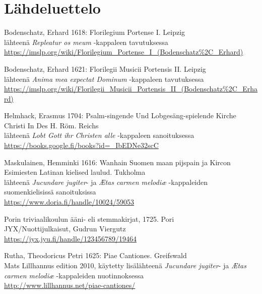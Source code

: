 \chapter*{Lähdeluettelo}

Bodenschatz, Erhard 1618: Florilegium Portense I. Leipzig \\
lähteenä \emph{Repleatur os meum} -kappaleen tavutuksessa \\
\url{https://imslp.org/wiki/Florilegium\_Portense\_I\_(Bodenschatz%2C\_Erhard)}

Bodenschatz, Erhard 1621: Florilegii Musicii Portensis II. Leipzig \\
lähteenä \emph{Anima mea expectat Dominum} -kappaleen tavutuksessa \\
\url{https://imslp.org/wiki/Florilegii\_Musicii\_Portensis\_II\_(Bodenschatz%2C\_Erhard)}

Helmhack, Erasmus 1704: Psalm-singende Und Lobgesäng-spielende Kirche Christi In Des H. Röm. Reichs \\
lähteenä \emph{Lobt Gott ihr Christen alle} -kappaleen sanoituksessa \\
\url{https://books.google.fi/books?id=\_IbEDNe32scC}

Maskulainen, Hemminki 1616: Wanhain Suomen maan pijspain ja Kircon Esimiesten Latinan kielised laulud. Tukholma \\
lähteenä \emph{Jucundare jugiter}- ja \emph{Ætas carmen melodiæ} -kappaleiden suomenkielisissä sanoituksissa \\
\url{https://www.doria.fi/handle/10024/59053}

Porin triviaalikoulun ääni- eli stemmakirjat, 1725. Pori \\
JYX/Nuottijulkaisut, Gudrun Viergutz \\
\url{https://jyx.jyu.fi/handle/123456789/19464}

Rutha, Theodoricus Petri 1625: Piae Cantiones. Greifswald \\
Mats Lillhannus edition 2010, käytetty lisälähteenä \emph{Jucundare jugiter}- ja \emph{Ætas carmen melodiæ} -kappaleiden nuotinnoksessa \\
\url{http://www.lillhannus.net/piae-cantiones/}
